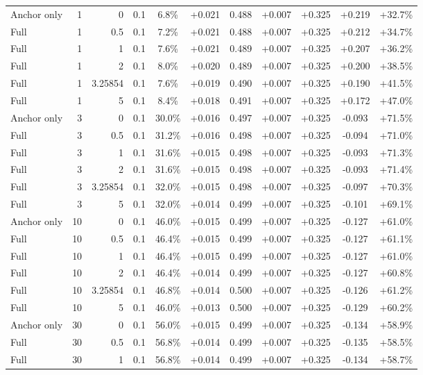 \begin{table}[htbp]
\begin{tabular}{lrrrccccccc}
Anchor only & 1 & 0 & 0.1 & 6.8\% & +0.021 & 0.488 & +0.007 & +0.325 & +0.219 & +32.7\% \\
Full & 1 & 0.5 & 0.1 & 7.2\% & +0.021 & 0.488 & +0.007 & +0.325 & +0.212 & +34.7\% \\
Full & 1 & 1 & 0.1 & 7.6\% & +0.021 & 0.489 & +0.007 & +0.325 & +0.207 & +36.2\% \\
Full & 1 & 2 & 0.1 & 8.0\% & +0.020 & 0.489 & +0.007 & +0.325 & +0.200 & +38.5\% \\
Full & 1 & 3.25854 & 0.1 & 7.6\% & +0.019 & 0.490 & +0.007 & +0.325 & +0.190 & +41.5\% \\
Full & 1 & 5 & 0.1 & 8.4\% & +0.018 & 0.491 & +0.007 & +0.325 & +0.172 & +47.0\% \\
Anchor only & 3 & 0 & 0.1 & 30.0\% & +0.016 & 0.497 & +0.007 & +0.325 & -0.093 & +71.5\% \\
Full & 3 & 0.5 & 0.1 & 31.2\% & +0.016 & 0.498 & +0.007 & +0.325 & -0.094 & +71.0\% \\
Full & 3 & 1 & 0.1 & 31.6\% & +0.015 & 0.498 & +0.007 & +0.325 & -0.093 & +71.3\% \\
Full & 3 & 2 & 0.1 & 31.6\% & +0.015 & 0.498 & +0.007 & +0.325 & -0.093 & +71.4\% \\
Full & 3 & 3.25854 & 0.1 & 32.0\% & +0.015 & 0.498 & +0.007 & +0.325 & -0.097 & +70.3\% \\
Full & 3 & 5 & 0.1 & 32.0\% & +0.014 & 0.499 & +0.007 & +0.325 & -0.101 & +69.1\% \\
Anchor only & 10 & 0 & 0.1 & 46.0\% & +0.015 & 0.499 & +0.007 & +0.325 & -0.127 & +61.0\% \\
Full & 10 & 0.5 & 0.1 & 46.4\% & +0.015 & 0.499 & +0.007 & +0.325 & -0.127 & +61.1\% \\
Full & 10 & 1 & 0.1 & 46.4\% & +0.015 & 0.499 & +0.007 & +0.325 & -0.127 & +61.0\% \\
Full & 10 & 2 & 0.1 & 46.4\% & +0.014 & 0.499 & +0.007 & +0.325 & -0.127 & +60.8\% \\
Full & 10 & 3.25854 & 0.1 & 46.8\% & +0.014 & 0.500 & +0.007 & +0.325 & -0.126 & +61.2\% \\
Full & 10 & 5 & 0.1 & 46.0\% & +0.013 & 0.500 & +0.007 & +0.325 & -0.129 & +60.2\% \\
Anchor only & 30 & 0 & 0.1 & 56.0\% & +0.015 & 0.499 & +0.007 & +0.325 & -0.134 & +58.9\% \\
Full & 30 & 0.5 & 0.1 & 56.8\% & +0.014 & 0.499 & +0.007 & +0.325 & -0.135 & +58.5\% \\
Full & 30 & 1 & 0.1 & 56.8\% & +0.014 & 0.499 & +0.007 & +0.325 & -0.134 & +58.7\% \\

\end{tabular}
\end{table}
